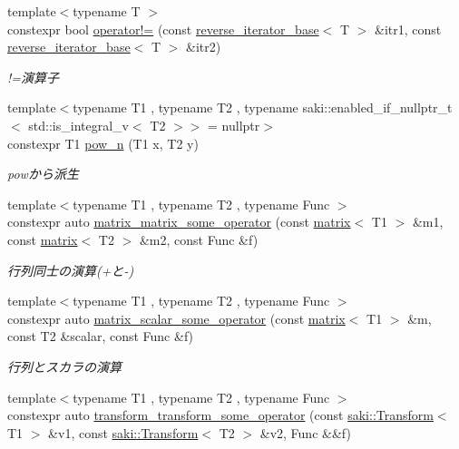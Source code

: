\begin{DoxyCompactItemize}
{\footnotesize template$<$typename T $>$ }\\constexpr bool \mbox{\hyperlink{namespacesaki_1_1details_a67a43f1e216aa1da9934815a21bfe2ee}{operator!=}} (const \mbox{\hyperlink{classsaki_1_1details_1_1reverse__iterator__base}{reverse\+\_\+iterator\+\_\+base}}$<$ T $>$ \&itr1, const \mbox{\hyperlink{classsaki_1_1details_1_1reverse__iterator__base}{reverse\+\_\+iterator\+\_\+base}}$<$ T $>$ \&itr2)
\begin{DoxyCompactList}\small\item\em !=演算子 \end{DoxyCompactList}\item 
{\footnotesize template$<$typename T1 , typename T2 , typename saki\+::enabled\+\_\+if\+\_\+nullptr\+\_\+t$<$ std\+::is\+\_\+integral\+\_\+v$<$ T2 $>$$>$  = nullptr$>$ }\\constexpr T1 \mbox{\hyperlink{namespacesaki_1_1details_a30b4cd78c970618ee2886123c28e4041}{pow\+\_\+n}} (T1 x, T2 y)
\begin{DoxyCompactList}\small\item\em powから派生 \end{DoxyCompactList}\item 
{\footnotesize template$<$typename T1 , typename T2 , typename Func $>$ }\\constexpr auto \mbox{\hyperlink{namespacesaki_1_1details_a95cd387e134b1b940cde0b171926e01e}{matrix\+\_\+matrix\+\_\+some\+\_\+operator}} (const \mbox{\hyperlink{classsaki_1_1matrix}{matrix}}$<$ T1 $>$ \&m1, const \mbox{\hyperlink{classsaki_1_1matrix}{matrix}}$<$ T2 $>$ \&m2, const Func \&f)
\begin{DoxyCompactList}\small\item\em 行列同士の演算(+と-\/) \end{DoxyCompactList}\item 
{\footnotesize template$<$typename T1 , typename T2 , typename Func $>$ }\\constexpr auto \mbox{\hyperlink{namespacesaki_1_1details_aa3d3214e16ce99b6f4aca7d61d41077f}{matrix\+\_\+scalar\+\_\+some\+\_\+operator}} (const \mbox{\hyperlink{classsaki_1_1matrix}{matrix}}$<$ T1 $>$ \&m, const T2 \&scalar, const Func \&f)
\begin{DoxyCompactList}\small\item\em 行列とスカラの演算 \end{DoxyCompactList}\item 
{\footnotesize template$<$typename T1 , typename T2 , typename Func $>$ }\\constexpr auto \mbox{\hyperlink{namespacesaki_1_1details_ac8ab9fdbf09089a0272297c3be7c51d4}{transform\+\_\+transform\+\_\+some\+\_\+operator}} (const \mbox{\hyperlink{classsaki_1_1_transform}{saki\+::\+Transform}}$<$ T1 $>$ \&v1, const \mbox{\hyperlink{classsaki_1_1_transform}{saki\+::\+Transform}}$<$ T2 $>$ \&v2, Func \&\&f)

\end{DoxyCompactItemize}
